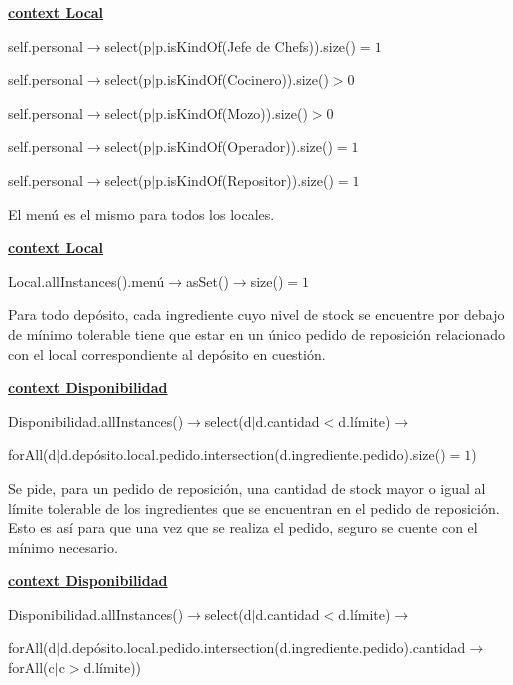 \documentclass[a4paper,10pt]{article}
\begin{document}
\medskip

\underline{\textbf{context Local}}

self.personal$\rightarrow$select(p$|$p.isKindOf(Jefe de Chefs)).size()$=1$

self.personal$\rightarrow$select(p$|$p.isKindOf(Cocinero)).size()$>0$

self.personal$\rightarrow$select(p$|$p.isKindOf(Mozo)).size()$>0$

self.personal$\rightarrow$select(p$|$p.isKindOf(Operador)).size()$=1$

self.personal$\rightarrow$select(p$|$p.isKindOf(Repositor)).size()$=1$

\bigskip

\noindent El men\'u es el mismo para todos los locales.

\medskip

\underline{\textbf{context Local}}

Local.allInstances().men\'u$\rightarrow$asSet()$\rightarrow$size()$=1$

\bigskip

\noindent Para todo dep\'osito, cada ingrediente cuyo nivel de stock se encuentre por debajo de mínimo tolerable tiene que estar en un \'unico pedido de reposición relacionado con el local correspondiente al dep\'osito en cuesti\'on.

\medskip

\underline{\textbf{context Disponibilidad}}

Disponibilidad.allInstances()$\rightarrow$select(d$|$d.cantidad$<$d.límite)$\rightarrow$

forAll(d$|$d.depósito.local.pedido.intersection(d.ingrediente.pedido).size()$=1$)    

\bigskip

\noindent Se pide, para un pedido de reposici\'on, una cantidad de stock mayor o igual al límite tolerable de los ingredientes que se encuentran en el pedido de reposición. 
Esto es as\'i para que una vez que se realiza el pedido, seguro se cuente con el m\'inimo necesario.

\medskip

\underline{\textbf{context Disponibilidad}}

Disponibilidad.allInstances()$\rightarrow$select(d$|$d.cantidad$<$d.límite)$\rightarrow$

forAll(d$|$d.depósito.local.pedido.intersection(d.ingrediente.pedido).cantidad$\rightarrow$forAll(c$|$c$>$d.límite))

\bigskip
\end{document}
